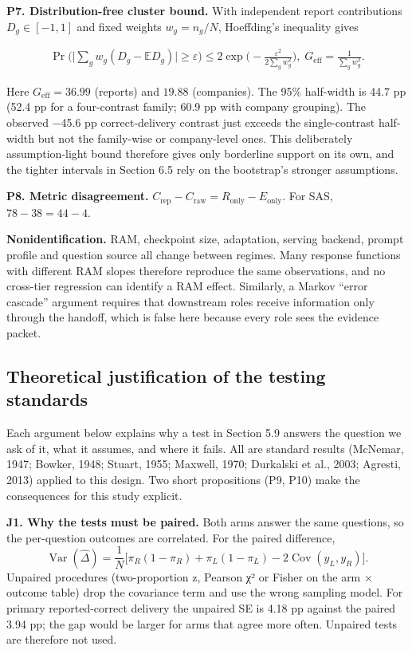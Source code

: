 \documentclass[letterpaper]{article}
\begin{document}
\textbf{P7. Distribution-free cluster bound.} With independent report contributions \(D_g\in[-1,1]\) and fixed weights \(w_g=n_g/N\), Hoeffding's inequality gives \begin{figure}[tbp]
\[\begin{gathered}\Pr\Big(\big|\textstyle\sum_g w_g(D_g-\mathbb{E}D_g)\big|\ge\varepsilon\Big)\le 2\exp\!\Big(-\frac{\varepsilon^2}{2\sum_g w_g^2}\Big),\; G_{\text{eff}}=\frac{1}{\sum_g w_g^2}.\end{gathered}\]
\end{figure} Here \(G_{\text{eff}}=36.99\) (reports) and \(19.88\) (companies). The 95\% half-width is 44.7 pp (52.4 pp for a four-contrast family; 60.9 pp with company grouping). The observed −45.6 pp correct-delivery contrast just exceeds the single-contrast half-width but not the family-wise or company-level ones. This deliberately assumption-light bound therefore gives only borderline support on its own, and the tighter intervals in Section 6.5 rely on the bootstrap's stronger assumptions.

\textbf{P8. Metric disagreement.} \(C_{\text{rep}}-C_{\text{raw}}=R_{\text{only}}-E_{\text{only}}\). For SAS, \(78-38=44-4\).

\textbf{Nonidentification.} RAM, checkpoint size, adaptation, serving backend, prompt profile and question source all change between regimes. Many response functions with different RAM slopes therefore reproduce the same observations, and no cross-tier regression can identify a RAM effect. Similarly, a Markov ``error cascade'' argument requires that downstream roles receive information only through the handoff, which is false here because every role sees the evidence packet.

\subsection{Theoretical justification of the testing standards}\label{theoretical-justification-of-the-testing-standards}

Each argument below explains why a test in Section 5.9 answers the question we ask of it, what it assumes, and where it fails. All are standard results (McNemar, 1947; Bowker, 1948; Stuart, 1955; Maxwell, 1970; Durkalski et al., 2003; Agresti, 2013) applied to this design. Two short propositions (P9, P10) make the consequences for this study explicit.

\textbf{J1. Why the tests must be paired.} Both arms answer the same questions, so the per-question outcomes are correlated. For the paired difference, \[\operatorname{Var}(\hat\Delta)=\frac{1}{N}\Big[\pi_R(1-\pi_R)+\pi_L(1-\pi_L)-2\operatorname{Cov}(y_{L},y_{R})\Big].\] Unpaired procedures (two-proportion z, Pearson χ² or Fisher on the arm × outcome table) drop the covariance term and use the wrong sampling model. For primary reported-correct delivery the unpaired SE is 4.18 pp against the paired 3.94 pp; the gap would be larger for arms that agree more often. Unpaired tests are therefore not used.
\end{document}
